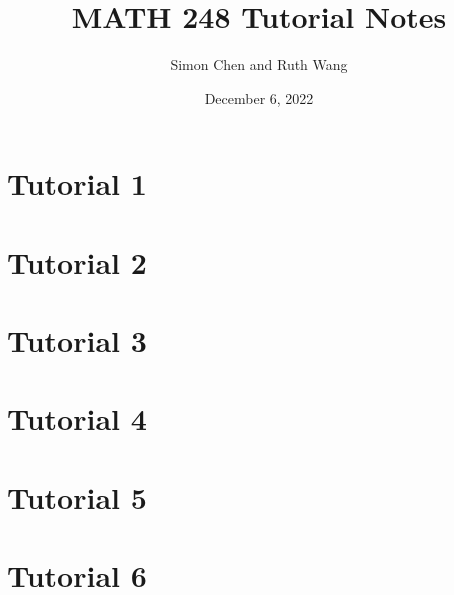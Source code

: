 \documentclass{article}
\title{MATH 248 Tutorial Notes}
\author{Simon Chen and Ruth Wang}
\date{December 6, 2022}
\theoremstyle{remark}
\theoremstyle{definition}
\numberwithin{equation}{section}
\begin{document}
\maketitle

{
\centering \hypersetup{hidelinks}
\tableofcontents
}

\newpage 

\setcounter{section}{1}
\section{\centering Tutorial 1}



\newpage

\setcounter{section}{2}
\section{\centering Tutorial 2}



\newpage 

\setcounter{section}{3}
\section{\centering Tutorial 3}



\newpage 

\setcounter{section}{4}
\section{\centering Tutorial 4}



\newpage 

\setcounter{section}{5}
\section{\centering Tutorial 5}



\newpage 

\setcounter{section}{6}
\section{\centering Tutorial 6}



\newpage 
\end{document}
